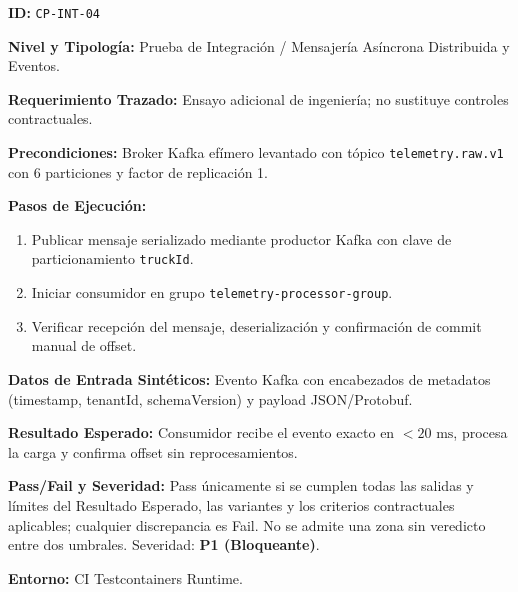 \par\noindent\textbf{ID:} \texttt{C\allowbreak{}P\allowbreak{}-\allowbreak{}I\allowbreak{}N\allowbreak{}T\allowbreak{}-\allowbreak{}0\allowbreak{}4\allowbreak{}}\par
\par\noindent\textbf{Nivel y Tipología:} Prueba de Integración / Mensajería Asíncrona Distribuida y Eventos.\par
\par\noindent\textbf{Requerimiento Trazado:} Ensayo adicional de ingeniería; no sustituye controles contractuales.\par
\par\noindent\textbf{Precondiciones:} Broker Kafka efímero levantado con tópico \texttt{t\allowbreak{}e\allowbreak{}l\allowbreak{}e\allowbreak{}m\allowbreak{}e\allowbreak{}t\allowbreak{}r\allowbreak{}y\allowbreak{}.\allowbreak{}r\allowbreak{}a\allowbreak{}w\allowbreak{}.\allowbreak{}v\allowbreak{}1\allowbreak{}} con 6 particiones y factor de replicación 1.\par
\par\noindent\textbf{Pasos de Ejecución:} \par
\begin{enumerate}
\item Publicar mensaje serializado mediante productor Kafka con clave de particionamiento \texttt{t\allowbreak{}r\allowbreak{}u\allowbreak{}c\allowbreak{}k\allowbreak{}I\allowbreak{}d\allowbreak{}}.
\item Iniciar consumidor en grupo \texttt{t\allowbreak{}e\allowbreak{}l\allowbreak{}e\allowbreak{}m\allowbreak{}e\allowbreak{}t\allowbreak{}r\allowbreak{}y\allowbreak{}-\allowbreak{}p\allowbreak{}r\allowbreak{}o\allowbreak{}c\allowbreak{}e\allowbreak{}s\allowbreak{}s\allowbreak{}o\allowbreak{}r\allowbreak{}-\allowbreak{}g\allowbreak{}r\allowbreak{}o\allowbreak{}u\allowbreak{}p\allowbreak{}}.
\item Verificar recepción del mensaje, deserialización y confirmación de commit manual de offset.
\end{enumerate}
\par\noindent\textbf{Datos de Entrada Sintéticos:} Evento Kafka con encabezados de metadatos (timestamp, tenantId, schemaVersion) y payload JSON/Protobuf.\par
\par\noindent\textbf{Resultado Esperado:} Consumidor recibe el evento exacto en \(< 20\text{ ms}\), procesa la carga y confirma offset sin reprocesamientos.\par
\par\noindent\textbf{Pass/Fail y Severidad:} Pass únicamente si se cumplen todas las salidas y límites del Resultado Esperado, las variantes y los criterios contractuales aplicables; cualquier discrepancia es Fail. No se admite una zona sin veredicto entre dos umbrales. Severidad: \textbf{P1 (Bloqueante)}.\par
\par\noindent\textbf{Entorno:} CI Testcontainers Runtime.\par






